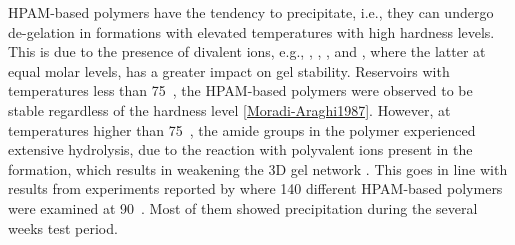 HPAM-based polymers have the tendency to precipitate, i.e., they can undergo de-gelation in formations with elevated temperatures with high hardness levels. This is due to the presence of divalent ions, e.g., , , , and , where the latter at equal molar levels, has a greater impact on gel stability. Reservoirs with temperatures less than 75~\celsius, the HPAM-based polymers were observed to be stable regardless of the hardness level \ref{Moradi-Araghi1987}. However, at temperatures higher than 75~\celsius, the amide groups in the polymer experienced extensive hydrolysis, due to the reaction with polyvalent ions present in the formation, which results in weakening the 3D gel network \citep{Al-Muntasheri2012, Stahl1989}. This goes in line with results from experiments reported by \citet{Davison1982} where 140 different HPAM-based polymers were examined at 90~\celsius. Most of them showed precipitation during the several weeks test period.

















